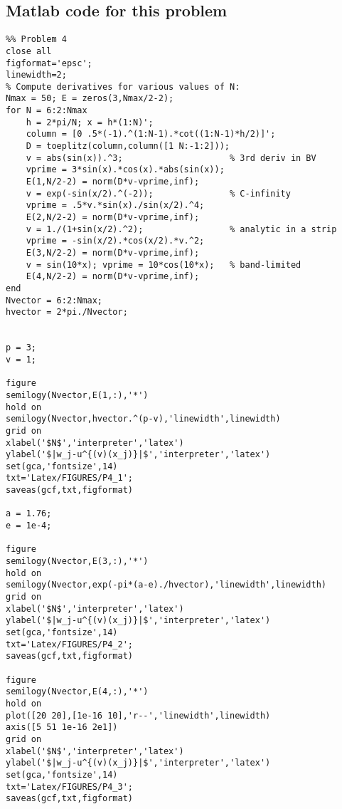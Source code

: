 \subsection*{Matlab code for this problem}
\begin{verbatim}
%% Problem 4
close all
figformat='epsc';
linewidth=2;
% Compute derivatives for various values of N:
Nmax = 50; E = zeros(3,Nmax/2-2);
for N = 6:2:Nmax
    h = 2*pi/N; x = h*(1:N)';
    column = [0 .5*(-1).^(1:N-1).*cot((1:N-1)*h/2)]';
    D = toeplitz(column,column([1 N:-1:2]));
    v = abs(sin(x)).^3;                     % 3rd deriv in BV
    vprime = 3*sin(x).*cos(x).*abs(sin(x));
    E(1,N/2-2) = norm(D*v-vprime,inf);
    v = exp(-sin(x/2).^(-2));               % C-infinity
    vprime = .5*v.*sin(x)./sin(x/2).^4;
    E(2,N/2-2) = norm(D*v-vprime,inf);
    v = 1./(1+sin(x/2).^2);                 % analytic in a strip
    vprime = -sin(x/2).*cos(x/2).*v.^2;
    E(3,N/2-2) = norm(D*v-vprime,inf);
    v = sin(10*x); vprime = 10*cos(10*x);   % band-limited
    E(4,N/2-2) = norm(D*v-vprime,inf);
end
Nvector = 6:2:Nmax;
hvector = 2*pi./Nvector;


p = 3;
v = 1;

figure
semilogy(Nvector,E(1,:),'*')
hold on
semilogy(Nvector,hvector.^(p-v),'linewidth',linewidth)
grid on
xlabel('$N$','interpreter','latex')
ylabel('$|w_j-u^{(v)(x_j)}|$','interpreter','latex')
set(gca,'fontsize',14)
txt='Latex/FIGURES/P4_1';
saveas(gcf,txt,figformat)

a = 1.76;
e = 1e-4;

figure
semilogy(Nvector,E(3,:),'*')
hold on
semilogy(Nvector,exp(-pi*(a-e)./hvector),'linewidth',linewidth)
grid on
xlabel('$N$','interpreter','latex')
ylabel('$|w_j-u^{(v)(x_j)}|$','interpreter','latex')
set(gca,'fontsize',14)
txt='Latex/FIGURES/P4_2';
saveas(gcf,txt,figformat)

figure
semilogy(Nvector,E(4,:),'*')
hold on
plot([20 20],[1e-16 10],'r--','linewidth',linewidth)
axis([5 51 1e-16 2e1])
grid on
xlabel('$N$','interpreter','latex')
ylabel('$|w_j-u^{(v)(x_j)}|$','interpreter','latex')
set(gca,'fontsize',14)
txt='Latex/FIGURES/P4_3';
saveas(gcf,txt,figformat)
\end{verbatim}
